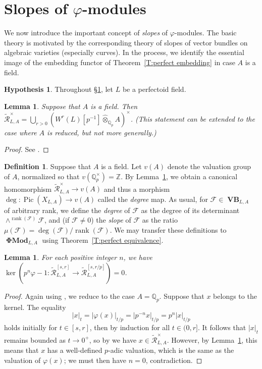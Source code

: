 \documentclass[12pt]{amsart}
\newtheorem{lemma}[theorem]{Lemma}
\theoremstyle{definition}
\newtheorem{defn}[theorem]{Definition}
\newtheorem{hypothesis}[theorem]{Hypothesis}
\numberwithin{equation}{theorem}
\newcommand{\QQ}{\mathbb{Q}}
\newcommand{\ZZ}{\mathbb{Z}}
\newcommand{\calF}{\mathcal{F}}
\newcommand{\calR}{\mathcal{R}}
\DeclareMathOperator{\PhiMod}{\mathbf{\Phi Mod}}
\DeclareMathOperator{\Pic}{Pic}
\DeclareMathOperator{\rank}{rank}
\DeclareMathOperator{\VB}{\mathbf{VB}}
\begin{document}
\section{Slopes of \texorpdfstring{$\varphi$}{phi}-modules}
\label{sec:slopes}

We now introduce the important concept of \emph{slopes} of $\varphi$-modules. The basic theory is motivated by the corresponding theory of slopes of vector bundles on algebraic varieties (especially curves). In the process, we identify the essential image of the embedding functor of Theorem~\ref{T:perfect embedding} in case $A$ is a field.

\begin{hypothesis}
Throughout \S\ref{sec:slopes}, let $L$ be a perfectoid field.
\end{hypothesis}

\begin{lemma} \label{L:units}
Suppose that $A$ is a field.
Then $\tilde{\calR}_{L,A}^{\times} = \bigcup_{r>0} (W^r(L)[p^{-1}] \widehat{\otimes}_{\QQ_p} A)^\times$.
(This statement can be extended to the case where $A$ is reduced, but not more generally.)
\end{lemma}
\begin{proof}
See \cite[Corollary~4.2.5]{kedlaya-liu1}.
\end{proof}

\begin{defn}
Suppose that $A$ is a field. Let $v(A)$ denote the valuation group of $A$, normalized so that $v(\QQ_p^\times) = \ZZ$. By Lemma~\ref{L:units},
we obtain a canonical homomorphism $\tilde{\calR}_{L,A}^{\times} \to v(A)$
and thus a morphism $\deg: \Pic(X_{L,A}) \to v(A)$ called the \emph{degree} map.
As usual, for $\calF \in \VB_{L,A}$ of arbitrary rank, we define the \emph{degree} of $\calF$ as the degree of its determinant $\wedge^{\rank(\calF)} \calF$, and (if $\calF \neq 0$) the \emph{slope} of $\calF$ as the ratio $\mu(\calF) = \deg(\calF)/\rank(\calF)$.
We may transfer these definitions to $\PhiMod_{L,A}$ using Theorem~\ref{T:perfect equivalence}.
\end{defn}

\begin{lemma} \label{L:no subinvariants}
For each positive integer $n$, we have
$\ker(p^n \varphi-1: \tilde{\calR}^{[s,r]}_{L,A} \to \tilde{\calR}^{[s,r/p]}_{L,A}) = 0$. \end{lemma}
\begin{proof}
Again using \cite[Lemma~2.2.9(b)]{kedlaya-liu1}, we reduce to the case $A = \QQ_p$.
Suppose that $x$ belongs to the kernel. The equality
\[
\left| x \right|_{t} = \left| \varphi(x) \right|_{t/p} = \left| p^{-n} x \right|_{t/p} 
= p^n \left| x \right|_{t/p}
\]
holds initially for $t \in [s, r]$, then by induction for all $t \in (0, r]$.
It follows that $\left| x \right|_t$ remains bounded as $t \to 0^+$, so by 
\cite[Lemma~4.2.4]{kedlaya-liu1} we have $x \in \tilde{\calR}_{L,A}^{\times}$.
However, by Lemma~\ref{L:units}, this means that $x$ has a well-defined $p$-adic valuation, which is the same as the valuation of $\varphi(x)$; we must then have $n=0$, contradiction.
\end{proof}
\end{document}

